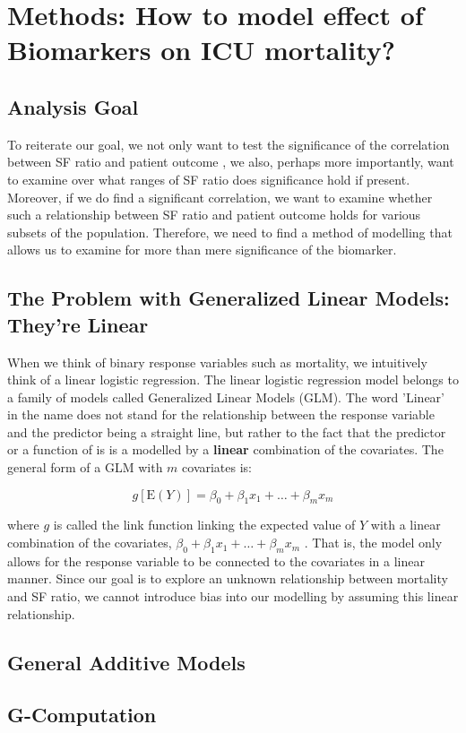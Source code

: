 
\chapter{Methods: How to model effect of Biomarkers on ICU mortality?} %

\label{Chapter3} %

\section{Analysis Goal}

To reiterate our goal, we not only want to test the significance of the correlation between SF ratio and patient outcome , we also, perhaps more importantly, want to examine over what ranges of SF ratio does significance hold if present. Moreover, if we do find a significant correlation, we want to examine whether such a relationship between SF ratio and patient outcome holds for various subsets of the population. Therefore, we need to find a method of modelling that allows us to examine for more than mere significance of the biomarker. 

\section{The Problem with Generalized Linear Models: They're Linear}

When we think of binary response variables such as mortality, we intuitively think of a linear logistic regression. The linear logistic regression  model belongs to a family of models called Generalized Linear Models (GLM). The word 'Linear' in the name does not stand for the relationship between the response variable and the predictor being a straight line, but rather to the fact that the predictor or a function of is is a modelled by a \textbf{linear} combination of the covariates. The general form of a GLM with $m$ covariates is: 

\begin{equation*}
g[\mathrm{E}(Y)]=\beta_{0}+\beta_{1} x_{1}+\ldots+\beta_{m} x_{m}
\end{equation*}

where $g$ is called the link function linking the expected value of $Y$ with a linear combination of the covariates, $
\beta_{0}+\beta_{1} x_{1}+\ldots+\beta_{m} x_{m}$ \citep{wood2017generalized}. That is, the model only allows for the response variable to be connected to the covariates in a linear manner. Since our goal is to explore an unknown relationship between mortality and SF ratio, we cannot introduce bias into our modelling by assuming this linear relationship. 


\section{General Additive Models}

\section{G-Computation}



